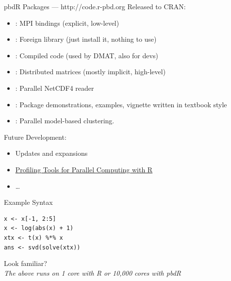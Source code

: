 \begin{frame}[shrink]
  \begin{block}{pbdR Packages --- http://code.r-pbd.org}\pause
  Released to CRAN:
  \begin{itemize}[<+-|alert@+>]
    \item {}: MPI bindings (explicit, low-level)
    \item {}: Foreign library (just install it, nothing to use)
    \item {}: Compiled code (used by DMAT, also for devs)
    \item {}: Distributed matrices (mostly implicit, high-level)
    \item {}: Parallel NetCDF4 reader
    \item {}: Package demonstrations, examples, vignette written in textbook style
    \item {}: Parallel model-based clustering.
  \end{itemize}
    Future Development:
  \begin{itemize}[<+-|alert@+>]
    \item Updates and expansions
    \item \href{http://rwiki.sciviews.org/doku.php?id=developers:projects:gsoc2013:mpiprofiler}{Profiling Tools for Parallel Computing with R}
    \item \dots
  \end{itemize}
  \end{block}
\end{frame}



\begin{frame}[fragile]
  \begin{block}{Example Syntax}\pause
  \begin{lstlisting}
x <- x[-1, 2:5]
x <- log(abs(x) + 1)
xtx <- t(x) %*% x
ans <- svd(solve(xtx))
  \end{lstlisting}
  \begin{center}
  \pause Look familiar?\\[.4cm] \pause
  \emph{The above runs on 1 core with R or 10,000 cores with pbdR}
  \end{center}
  \end{block}
\end{frame}


